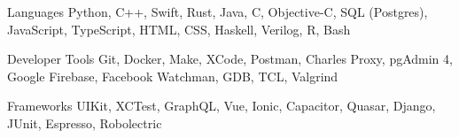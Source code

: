 

\begin{cvskills}


  \cvskill
    {Languages} %
    {Python, C++, Swift, Rust, Java, C, Objective-C, SQL (Postgres), JavaScript, TypeScript, HTML, CSS, Haskell, Verilog, R, Bash} %

  \cvskill
    {Developer Tools} %
    {Git, Docker, Make, XCode, Postman, Charles Proxy, pgAdmin 4, Google Firebase, Facebook Watchman, GDB, TCL, Valgrind} %

  \cvskill
  {Frameworks} %
  {UIKit, XCTest, GraphQL, Vue, Ionic, Capacitor, Quasar, Django, JUnit, Espresso, Robolectric} %

\end{cvskills}
